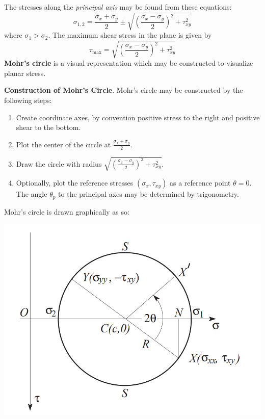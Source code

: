 The stresses along the \textit{principal axis} may be found from these equations: \[\sigma_{1,2}=\frac{\sigma_x+\sigma_y}{2}\pm \sqrt{\left(\frac{\sigma_x-\sigma_y}{2}\right)^2 + \tau_{xy}^2}\] where $\sigma_1>\sigma_2$. The maximum shear stress in the plane is given by \[\tau_\text{max} = \sqrt{\left(\frac{\sigma_x-\sigma_y}{2}\right)^2 + \tau_{xy}^2}\] 
\newpage
\textbf{Mohr's circle} is a visual representation which may be constructed to visualize planar stress. \begin{shaded}
    \textbf{Construction of Mohr's Circle}. Mohr's circle may be constructed by the following steps: 
    \vspace{-1em}
    \begin{enumerate}
        \item Create coordinate axes, by convention positive stress to the right and positive shear to the bottom.
        \item Plot the center of the circle at $\frac{\sigma_x+\sigma_y}{2}$.
        \item Draw the circle with radius $\sqrt{\left(\frac{\sigma_x-\sigma_y}{2}\right)^2+\tau_{xy}^2}$.
        \item Optionally, plot the reference stresses $(\sigma_{x},\tau_{xy})$ as a reference point $\theta=0$. The angle $\theta_p$ to the principal axes may be determined by trigonometry.
    \end{enumerate}
\end{shaded}


Mohr's circle is drawn graphically as so: \begin{center}\includegraphics[scale=0.5]{Images/statics_mohrs.png}\end{center}

